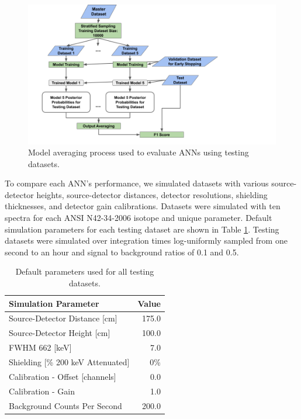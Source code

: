\begin{figure}[H]
	\centering
	\includegraphics[trim=0 0 210 0,clip,width=1.0\linewidth]{images/generalization_performance_diagram}
	\caption{Model averaging process used to evaluate ANNs using testing datasets.}
	\label{fig:generalization_performance_diagram}
\end{figure}

To compare each ANN's performance, we simulated datasets with various source-detector heights, source-detector distances, detector resolutions, shielding thicknesses, and detector gain calibrations. Datasets were simulated with ten spectra for each ANSI N42-34-2006 isotope and unique parameter. Default simulation parameters for each testing dataset are shown in Table \ref{table:default_sim_params}. Testing datasets were simulated over integration times log-uniformly sampled from one second to an hour and signal to background ratios of 0.1 and 0.5.

\begin{table}[H]
\centering
\caption{Default parameters used for all testing datasets.}
\label{table:default_sim_params}
\begin{tabular}{lr}
\hline
\textbf{Simulation Parameter} &  \textbf{Value} \\ \hline
Source-Detector Distance [cm] & 175.0\\ 
Source-Detector Height [cm] & 100.0\\ 
FWHM 662 [keV] & 7.0\\ 
Shielding [\% 200 keV Attenuated] & 0\% \\ 
Calibration - Offset [channels] & 0.0 \\ 
Calibration - Gain & 1.0 \\ 
Background Counts Per Second & 200.0 \\ \hline 
\end{tabular}
\end{table}


